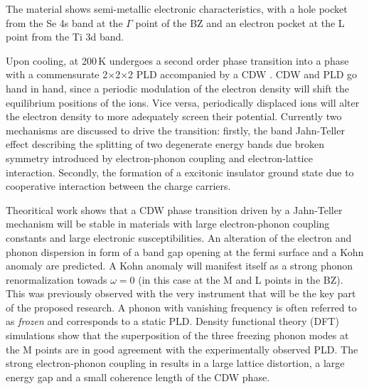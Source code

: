 The material shows semi-metallic electronic characteristics\cite{bachrach1976}, with a hole pocket from the Se 4s band at the $\Gamma$ point of the \ac{BZ} and an electron pocket at the L point from the Ti 3d band\cite{zunger1978}.

Upon cooling, at 200\,K \cite{disalvo1976} \ts\space undergoes a second order phase transition into a phase with a commensurate 2$\times$2$\times$2 \ac{PLD} accompanied by a \ac{CDW} \cite{rossnagel2011}.
\ac{CDW} and \ac{PLD} go hand in hand, since a periodic modulation of the electron density will shift the equilibrium positions of the ions.
Vice versa, periodically displaced ions will alter the electron density to more adequately screen their potential.
Currently two mechanisms are discussed to drive the transition: 
firstly, the band Jahn-Teller effect describing the splitting of two degenerate energy bands due broken symmetry introduced by electron-phonon coupling and electron-lattice interaction\cite{JT}.
Secondly, the formation of a excitonic insulator ground state due to cooperative interaction between the charge carriers\cite{EI}.

Theoritical work shows that a \ac{CDW} phase transition driven by a Jahn-Teller mechanism will be stable in materials with large electron-phonon coupling constants and large electronic susceptibilities\cite{friend1979}.
An alteration of the electron and phonon dispersion in form of a band gap opening at the fermi surface and a Kohn anomaly are predicted.
A Kohn anomaly will manifest itself as a strong phonon renormalization towads $\omega=0$\cite{kohn1959} (in this case at the M and L points in the \ac{BZ}).
This was previously observed with the very instrument that will be the key part of the proposed research\cite{otto2021}.
A phonon with vanishing frequency is often referred to as \emph{frozen} and corresponds to a static \ac{PLD}.
Density functional theory (DFT) simulations show that the superposition of the three freezing phonon modes at the M points are in good agreement with the experimentally observed \ac{PLD}\cite{kaneko2018}. %
The strong electron-phonon coupling in \ts\space results in a large lattice distortion, a large energy gap and a small coherence length of the \ac{CDW} phase\cite{haas1978,hildebrand2016}.




